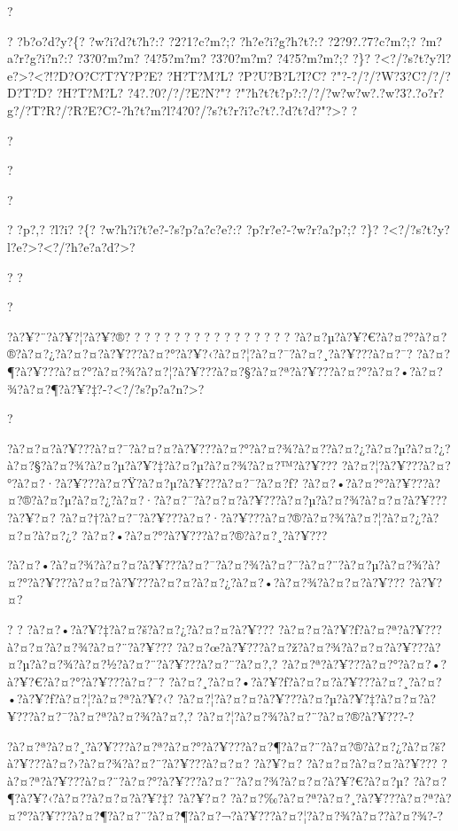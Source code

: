 \documentclass[11pt, openany]{book}
\begin{document}
{{{{{{{{{{{?

? ?b?o?d?y?\{? ?w?i?d?t?h?:? ?2?1?c?m?;? ?h?e?i?g?h?t?:? ?2?9?.?7?c?m?;?
?m?a?r?g?i?n?:? ?3?0?m?m? ?4?5?m?m? ?3?0?m?m? ?4?5?m?m?;? ?\}?
?\textless{}?/?s?t?y?l?e?\textgreater{}?\textless{}?!?D?O?C?T?Y?P?E?
?H?T?M?L? ?P?U?B?L?I?C? ?"?-?/?/?W?3?C?/?/?D?T?D? ?H?T?M?L?
?4?.?0?/?/?E?N?"?
?"?h?t?t?p?:?/?/?w?w?w?.?w?3?.?o?r?g?/?T?R?/?R?E?C?-?h?t?m?l?4?0?/?s?t?r?i?c?t?.?d?t?d?"?\textgreater{}?
?

?

?

?

? ?p?,? ?l?i? ?\{? ?w?h?i?t?e?-?s?p?a?c?e?:? ?p?r?e?-?w?r?a?p?;? ?\}?
?\textless{}?/?s?t?y?l?e?\textgreater{}?\textless{}?/?h?e?a?d?\textgreater{}?

? ?

?

?à?¥?¨?à?¥?¦?à?¥?®? ? ? ? ? ? ? ? ? ? ? ? ? ? ? ? ?
?à?¤?µ?à?¥?€?à?¤?°?à?¤?®?à?¤?¿?à?¤?¤?à?¥???à?¤?°?à?¥?‹?à?¤?¦?à?¤?¯?à?¤?¸?à?¥???à?¤?¯?
?à?¤?¶?à?¥???à?¤?°?à?¤?¾?à?¤?¦?à?¥???à?¤?§?à?¤?ª?à?¥???à?¤?°?à?¤?•?à?¤?¾?à?¤?¶?à?¥?‡?-?\textless{}?/?s?p?a?n?\textgreater{}?

?

?à?¤?¤?à?¥???à?¤?¯?à?¤?¤?à?¥???à?¤?°?à?¤?¾?à?¤?­?à?¤?¿?à?¤?µ?à?¤?¿?à?¤?§?à?¤?¾?à?¤?µ?à?¥?‡?à?¤?µ?à?¤?¾?à?¤?™?à?¥???
?à?¤?¦?à?¥???à?¤?°?à?¤?·?à?¥???à?¤?Ÿ?à?¤?µ?à?¥???à?¤?¯?à?¤?ƒ?
?à?¤?•?à?¤?°?à?¥???à?¤?®?à?¤?µ?à?¤?¿?à?¤?·?à?¤?¯?à?¤?¤?à?¥???à?¤?µ?à?¤?¾?à?¤?¤?à?¥???
?à?¥?¤?
?à?¤?†?à?¤?¯?à?¥???à?¤?·?à?¥???à?¤?®?à?¤?¾?à?¤?¦?à?¤?¿?à?¤?¤?à?¤?¿?
?à?¤?•?à?¤?°?à?¥???à?¤?®?à?¤?¸?à?¥???

?à?¤?•?à?¤?¾?à?¤?¤?à?¥???à?¤?¯?à?¤?¾?à?¤?¯?à?¤?¨?à?¤?µ?à?¤?¾?à?¤?°?à?¥???à?¤?¤?à?¥???à?¤?¤?à?¤?¿?à?¤?•?à?¤?¾?à?¤?¤?à?¥???
?à?¥?¤?

? ? ?à?¤?•?à?¥?‡?à?¤?š?à?¤?¿?à?¤?¤?à?¥???
?à?¤?¤?à?¥?ƒ?à?¤?ª?à?¥???à?¤?¤?à?¤?¾?à?¤?¨?à?¥???
?à?¤?œ?à?¥???à?¤?ž?à?¤?¾?à?¤?¤?à?¥???à?¤?µ?à?¤?¾?à?¤?½?à?¤?¨?à?¥???à?¤?¨?à?¤?‚?
?à?¤?ª?à?¥???à?¤?°?à?¤?•?à?¥?€?à?¤?°?à?¥???à?¤?¯?
?à?¤?¸?à?¤?•?à?¥?ƒ?à?¤?¤?à?¥???à?¤?¸?à?¤?•?à?¥?ƒ?à?¤?¦?à?¤?ª?à?¥?‹?
?à?¤?¦?à?¤?¤?à?¥???à?¤?µ?à?¥?‡?à?¤?¤?à?¥???à?¤?¯?à?¤?ª?à?¤?¾?à?¤?‚?
?à?¤?¦?à?¤?¾?à?¤?¨?à?¤?®?à?¥???-?

?à?¤?ª?à?¤?¸?à?¥???à?¤?ª?à?¤?°?à?¥???à?¤?¶?à?¤?¨?à?¤?®?à?¤?¿?à?¤?š?à?¥???à?¤?›?à?¤?¾?à?¤?¨?à?¥???à?¤?¤?
?à?¥?¤? ?à?¤?¤?à?¤?¤?à?¥???
?à?¤?ª?à?¥???à?¤?¨?à?¤?°?à?¥???à?¤?¨?à?¤?¾?à?¤?¤?à?¥?€?à?¤?µ?
?à?¤?¶?à?¥?‹?à?¤?­?à?¤?¤?à?¥?‡? ?à?¥?¤?
?à?¤?‰?à?¤?ª?à?¤?¸?à?¥???à?¤?ª?à?¤?°?à?¥???à?¤?¶?à?¤?¨?à?¤?¶?à?¤?¬?à?¥???à?¤?¦?à?¤?¾?à?¤?­?à?¤?¾?-?

}}}}}}}}}}}
\end{document}
